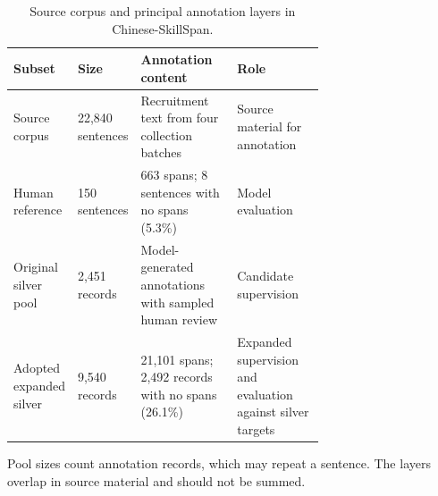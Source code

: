 \documentclass[fleqn,12pt]{wlpeerj}
\begin{document}
\setcounter{table}{2}
\begin{table}[!htbp]
\caption{Source corpus and principal annotation layers in Chinese-SkillSpan.}
\label{tab:annotation-lineage}
\centering\small
\setlength{\tabcolsep}{4pt}
\begin{tabularx}{\linewidth}{@{}P{0.20\linewidth}P{0.18\linewidth}P{0.31\linewidth}L@{}}
\toprule
Subset & Size & Annotation content & Role \\
\midrule
Source corpus & 22,840 sentences & Recruitment text from four collection batches & Source material for annotation \\
Human reference & 150 sentences & 663 spans; 8 sentences with no spans (5.3\%) & Model evaluation \\
Original silver pool & 2,451 records & Model-generated annotations with sampled human review & Candidate supervision \\
Adopted expanded silver & 9,540 records & 21,101 spans; 2,492 records with no spans (26.1\%) & Expanded supervision and evaluation against silver targets \\
\bottomrule
\end{tabularx}
\par\smallskip
{\footnotesize\RaggedRight Pool sizes count annotation records, which may repeat a sentence. The layers overlap in source material and should not be summed.\par}
\end{table}

\end{document}
